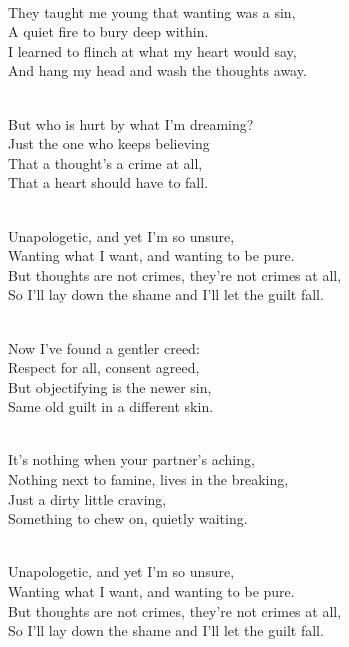 \begin{lyrics}
\\
They taught me young that wanting was a sin,\\
A quiet fire to bury deep within.\\
I learned to flinch at what my heart would say,\\
And hang my head and wash the thoughts away.

\\
But who is hurt by what I'm dreaming?\\
Just the one who keeps believing\\
That a thought's a crime at all,\\
That a heart should have to fall.

\\
Unapologetic, and yet I'm so unsure,\\
Wanting what I want, and wanting to be pure.\\
But thoughts are not crimes, they're not crimes at all,\\
So I'll lay down the shame and I'll let the guilt fall.

\\
Now I've found a gentler creed:\\
Respect for all, consent agreed,\\
But objectifying is the newer sin,\\
Same old guilt in a different skin.

\\
It's nothing when your partner's aching,\\
Nothing next to famine, lives in the breaking,\\
Just a dirty little craving,\\
Something to chew on, quietly waiting.

\\
Unapologetic, and yet I'm so unsure,\\
Wanting what I want, and wanting to be pure.\\
But thoughts are not crimes, they're not crimes at all,\\
So I'll lay down the shame and I'll let the guilt fall.


\end{lyrics}
